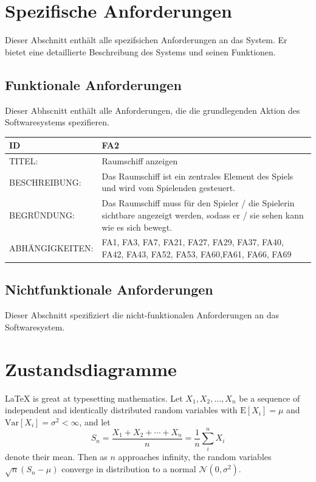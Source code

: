 \documentclass{article}
\begin{document}
\section{Spezifische Anforderungen}

Dieser Abschnitt enthält alle spezifsichen Anforderungen an das System. Er bietet eine detaillierte Beschreibung des Systems und seinen Funktionen.



\subsection{Funktionale Anforderungen}

Dieser Abhscnitt enthält alle  Anforderungen, die die grundlegenden Aktion des Softwaresystems spezifieren.


     \begin{tabularx}{\textwidth}{|l|X |} \hline
        \textbf{ID} & \textbf{FA2} \\
        \hline
        TITEL: & Raumschiff anzeigen \\
        \hline
        BESCHREIBUNG: & Das Raumschiff ist ein zentrales Element des Spiels und wird vom Spielenden gesteuert.
        \\
        \hline
        BEGRÜNDUNG: & Das Raumschiff muss für den Spieler / die Spielerin sichtbare angezeigt werden, sodass er / sie sehen kann wie es sich bewegt. \\
        \hline
        ABHÄNGIGKEITEN: & FA1, FA3, FA7, FA21, FA27, FA29, FA37,  FA40, FA42, FA43, FA52, FA53, FA60,FA61, FA66, FA69\\
        \hline
    \end{tabularx}

\subsection{Nichtfunktionale Anforderungen}

  Dieser Abschnitt spezifiziert die nicht-funktionalen Anforderungen an das Softwaresystem.


\section{Zustandsdiagramme}

\LaTeX{} is great at typesetting mathematics. Let $X_1, X_2, \ldots, X_n$ be a sequence of independent and identically distributed random variables with $\text{E}[X_i] = \mu$ and $\text{Var}[X_i] = \sigma^2 < \infty$, and let
\[S_n = \frac{X_1 + X_2 + \cdots + X_n}{n}
      = \frac{1}{n}\sum_{i}^{n} X_i\]
denote their mean. Then as $n$ approaches infinity, the random variables $\sqrt{n}(S_n - \mu)$ converge in distribution to a normal $\mathcal{N}(0, \sigma^2)$.
\end{document}
